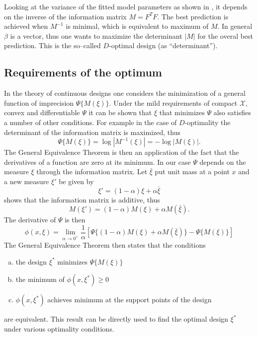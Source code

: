 \documentclass[12pt]{iopart}
\begin{document}
Looking at the variance of the fitted model parameters as shown in , it depends on the inverse of the information matrix $M = F^TF$. The best prediction is achieved when $M^{-1}$ is minimal, which is equivalent to maximum of $M$. In general $\beta$ is a vector, thus one wants to maximize the determinant $|M|$ for the overal best prediction. This is the so--called $D$-optimal design (as ``determinant'').

\subsection{Requirements of the optimum}
\label{sec:get}

In the theory of continuous designs one considers the minimization of a general function of imprecision $\Psi\{M(\xi)\}$. Under the mild requirements of compact $\mathcal{X}$, convex and differentiable $\Psi$ it can be shown that $\xi$ that minimizes $\Psi$ also satisfies a number of other conditions. For example in the case of $D$-optimality the determinant of the information matrix is maximized, thus
\begin{equation}
\Psi\{M(\xi)\} = \log|M^{-1}(\xi)| = - \log|M(\xi)|.
\end{equation}
The General Equivalence Theorem is then an application of the fact that the derivatives of a function are zero at its minimum. In our case $\Psi$ depends on the measure $\xi$ through the information matrix. Let $\bar \xi$ put unit mass at a point $x$ and a new measure $\xi'$ be given by
\begin{equation}
\xi' = (1-\alpha)\xi + \alpha \bar \xi
\end{equation}
 shows that the information matrix is additive, thus
\begin{equation}
M(\xi') = (1-\alpha)M(\xi) + \alpha M(\bar \xi).
\end{equation}
The derivative of $\Psi$ is then
\begin{equation}
\phi(x, \xi) = \lim_{\alpha \rightarrow 0^+} \frac{1}{\alpha}\left[\Psi\{(1-\alpha)M(\xi) + \alpha M(\bar \xi)\} - \Psi\{M(\xi)\}\right]
\label{eq:deriv}
\end{equation}
The General Equivalence Theorem then states that the conditions
\begin{enumerate}[(a)]
\item the design $\xi^*$ minimizes $\Psi\{M(\xi)\}$
\item the minimum of $\phi(x, \xi^*) \geq 0$
\item $\phi(x, \xi^*)$ achieves minimum at the support points of the design
\end{enumerate}
are equivalent. This result can be directly used to find the optimal design $\xi^*$ under various optimality conditions.
\end{document}
